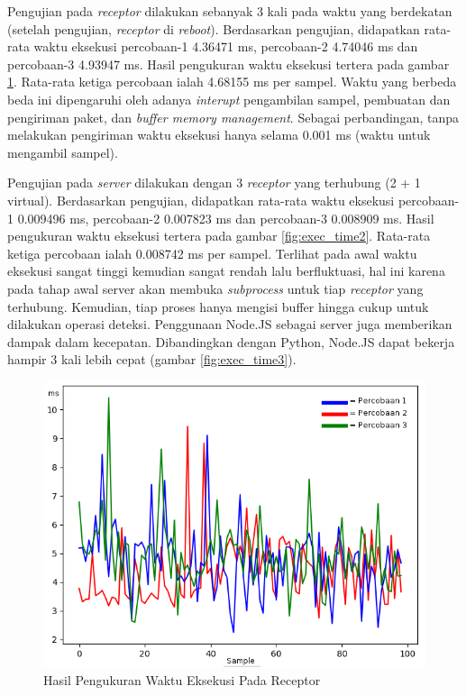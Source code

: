 Pengujian pada \textit{receptor} dilakukan sebanyak 3 kali pada waktu yang berdekatan (setelah pengujian, \textit{receptor} di \textit{reboot}). Berdasarkan pengujian, didapatkan rata-rata waktu eksekusi percobaan-1 4.36471 ms, percobaan-2 4.74046 ms dan percobaan-3 4.93947 ms. Hasil pengukuran waktu eksekusi tertera pada gambar \ref{fig:exec_time}. Rata-rata ketiga percobaan ialah 4.68155 ms per sampel. Waktu yang berbeda beda ini dipengaruhi oleh adanya \textit{interupt} pengambilan sampel, pembuatan dan pengiriman paket, dan \textit{buffer memory management}. Sebagai perbandingan, tanpa melakukan pengiriman waktu eksekusi hanya selama 0.001 ms (waktu untuk mengambil sampel).

Pengujian pada \textit{server} dilakukan dengan 3 \textit{receptor} yang terhubung (2 + 1 virtual). Berdasarkan pengujian, didapatkan rata-rata waktu eksekusi percobaan-1 0.009496 ms, percobaan-2 0.007823 ms dan percobaan-3 0.008909 ms. Hasil pengukuran waktu eksekusi tertera pada gambar \ref{fig:exec_time2}. Rata-rata ketiga percobaan ialah 0.008742 ms per sampel. Terlihat pada awal waktu eksekusi sangat tinggi kemudian sangat rendah lalu berfluktuasi, hal ini karena pada tahap awal server akan membuka \textit{subprocess} untuk tiap \textit{receptor} yang terhubung. Kemudian, tiap proses hanya mengisi buffer hingga cukup untuk dilakukan operasi deteksi. Penggunaan Node.JS sebagai server juga memberikan 
dampak dalam kecepatan. Dibandingkan dengan Python, Node.JS dapat bekerja hampir 3 kali lebih cepat (gambar \ref{fig:exec_time3}).

\begin{figure}[H]
	\centering
	\includegraphics[scale=0.5]{images/exec_time1.png}
	\caption{Hasil Pengukuran Waktu Eksekusi Pada Receptor}
	\label{fig:exec_time}
\end{figure}

